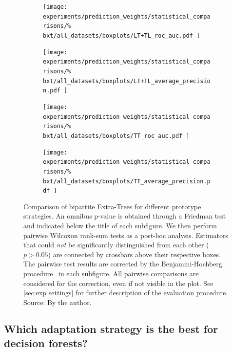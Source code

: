 \begin{figure}[tbh]
    \centering
    \begin{subfigure}{0.49\textwidth}
        \texttt{[image: 
            experiments/prediction\_weights/statistical\_comparisons/\%
            bxt/all\_datasets/boxplots/LT+TL\_roc\_auc.pdf
        ]}
    \end{subfigure}
    \begin{subfigure}{0.49\textwidth}
        \texttt{[image: 
            experiments/prediction\_weights/statistical\_comparisons/\%
            bxt/all\_datasets/boxplots/LT+TL\_average\_precision.pdf
        ]}
    \end{subfigure}

    \begin{subfigure}{0.49\textwidth}
        \texttt{[image: 
            experiments/prediction\_weights/statistical\_comparisons/\%
            bxt/all\_datasets/boxplots/TT\_roc\_auc.pdf
        ]}
    \end{subfigure}
    \begin{subfigure}{0.49\textwidth}
        \texttt{[image: 
            experiments/prediction\_weights/statistical\_comparisons/\%
            bxt/all\_datasets/boxplots/TT\_average\_precision.pdf
        ]}
    \end{subfigure}
    \caption{
        Comparison of bipartite Extra-Trees for different prototype strategies.
        An omnibus p-value is obtained through a Friedman test and indicated below the title of each subfigure.
        We then perform pairwise Wilcoxon rank-sum tests as a post-hoc analysis.
        Estimators that could \emph{not} be significantly distinguished from each other ($p > 0.05$) are connected by crossbars above their respective boxes. 
        The pairwise test results are corrected by the Benjamini-Hochberg procedure~\cite{benjamini1995controlling,haynes2013benjamini} in each subfigure. All pairwise comparisons are considered for the correction, even if not visible in the plot.
        See \autoref{sec:exp settings} for further description of the evaluation procedure. \newline Source: By the author.
    }
    \label{fig:pred_weights_bxt}
\end{figure}



\subsection{Which adaptation strategy is the best for decision forests?}
\label{sec:adaptation_comparison}

